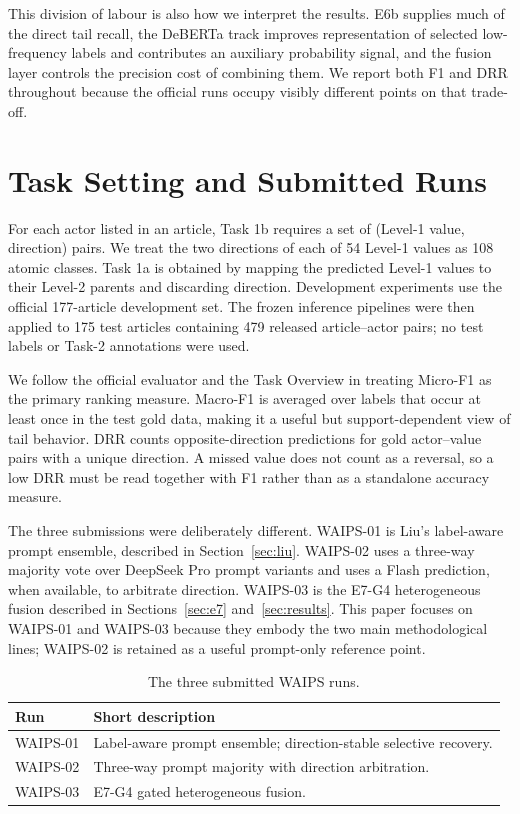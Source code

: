 \documentclass[sigconf,article,a4paper]{acmart}
\begin{document}
This division of labour is also how we interpret the results. E6b supplies much
of the direct tail recall, the DeBERTa track improves representation of
selected low-frequency labels and contributes an auxiliary probability signal,
and the fusion layer controls the precision cost of combining them. We report
both F1 and DRR throughout because the official runs occupy visibly different
points on that trade-off.

\section{Task Setting and Submitted Runs}

For each actor listed in an article, Task 1b requires a set of (Level-1 value,
direction) pairs. We treat the two directions of each of 54 Level-1 values as
108 atomic classes. Task 1a is obtained by mapping the predicted Level-1 values
to their Level-2 parents and discarding direction. Development experiments use
the official 177-article development set. The frozen inference pipelines were
then applied to 175 test articles containing 479 released article--actor pairs;
no test labels or Task-2 annotations were used.

We follow the official evaluator and the Task Overview in treating Micro-F1 as
the primary ranking measure. Macro-F1 is averaged over labels that occur at
least once in the test gold data, making it a useful but support-dependent view
of tail behavior. DRR counts opposite-direction predictions for gold
actor--value pairs with a unique direction. A missed value does not count as a
reversal, so a low DRR must be read together with F1 rather than as a standalone
accuracy measure.

The three submissions were deliberately different. WAIPS-01 is Liu's
label-aware prompt ensemble, described in Section~\ref{sec:liu}. WAIPS-02 uses
a three-way majority vote over DeepSeek Pro prompt variants and uses a Flash
prediction, when available, to arbitrate direction. WAIPS-03 is the E7-G4
heterogeneous fusion described in Sections~\ref{sec:e7} and~\ref{sec:results}.
This paper focuses on WAIPS-01 and WAIPS-03 because they embody the two main
methodological lines; WAIPS-02 is retained as a useful prompt-only reference
point.

\begin{table}[H]
  \caption{The three submitted WAIPS runs.}
  \label{tab:runs}
  \small
  \begin{tabularx}{\columnwidth}{@{}lX@{}}
    \toprule
    Run & Short description \\
    \midrule
    WAIPS-01 & Label-aware prompt ensemble; direction-stable selective recovery. \\
    WAIPS-02 & Three-way prompt majority with direction arbitration. \\
    WAIPS-03 & E7-G4 gated heterogeneous fusion. \\
    \bottomrule
  \end{tabularx}
\end{table}
\end{document}
